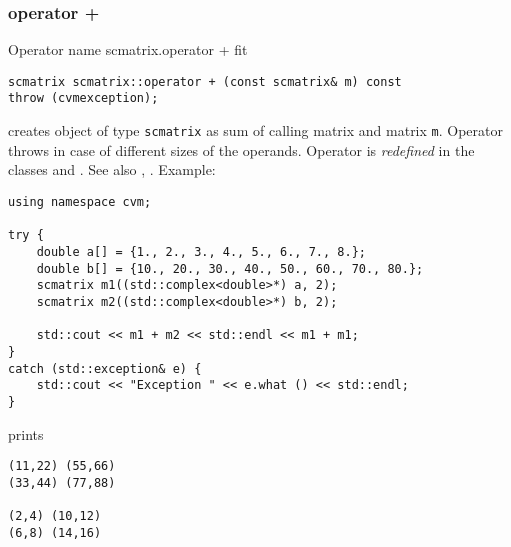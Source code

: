 \subsubsection{operator +}
Operator%
\pdfdest name {scmatrix.operator +} fit
\begin{verbatim}
scmatrix scmatrix::operator + (const scmatrix& m) const
throw (cvmexception);
\end{verbatim}
creates  object of type \verb"scmatrix" as  sum of
 calling matrix and  matrix \verb"m".
Operator throws  
in case of different sizes of the operands.
Operator is \emph{redefined} in the classes
and .
See also , .
Example:
\begin{Verbatim}
using namespace cvm;

try {
    double a[] = {1., 2., 3., 4., 5., 6., 7., 8.};
    double b[] = {10., 20., 30., 40., 50., 60., 70., 80.};
    scmatrix m1((std::complex<double>*) a, 2);
    scmatrix m2((std::complex<double>*) b, 2);

    std::cout << m1 + m2 << std::endl << m1 + m1;
}
catch (std::exception& e) {
    std::cout << "Exception " << e.what () << std::endl;
}
\end{Verbatim}
prints
\begin{Verbatim}
(11,22) (55,66)
(33,44) (77,88)

(2,4) (10,12)
(6,8) (14,16)
\end{Verbatim}
\newpage






